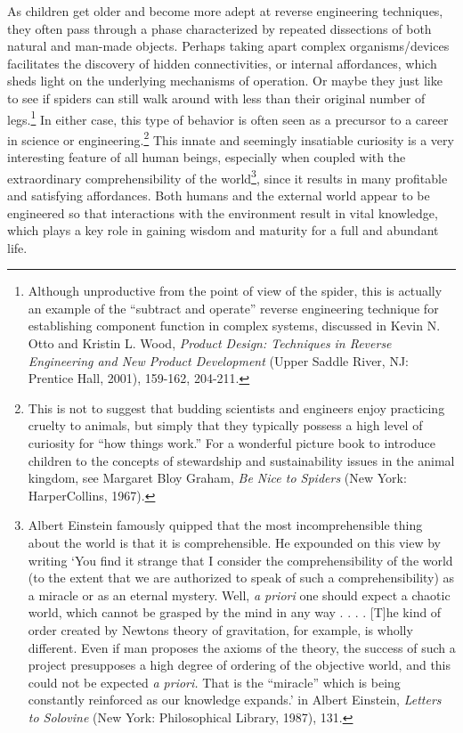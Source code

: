 As children get older and become more adept at reverse engineering
techniques, they often pass through a phase characterized by repeated
dissections of both natural and man-made objects. Perhaps taking apart
complex organisms/devices facilitates the discovery of hidden
connectivities, or internal affordances, which sheds light on the
underlying mechanisms of operation. Or maybe they just like to see if
spiders can still walk around with less than their original number of
legs.\footnote{Although unproductive from the point of view of the
spider, this is actually an example of the “subtract and operate”
reverse engineering technique for establishing component function in
complex systems, discussed in Kevin N. Otto and Kristin L. Wood,
\textit{Product Design: Techniques }\textit{in Reverse Engineering and
New Product Development} (Upper Saddle River, NJ: Prentice Hall, 2001),
159-162, 204-211.}
In either case, this type of behavior is often
seen as a precursor to a career in science or
engineering.\footnote{
This is not to suggest that budding scientists and
engineers enjoy practicing cruelty to animals, but simply that they
typically possess a high level of curiosity for “how things work.” For
a wonderful picture book to introduce children to the concepts of
stewardship and sustainability issues in the animal kingdom, see
Margaret Bloy Graham, \textit{Be Nice to Spiders} (New York:
HarperCollins, 1967).
}
This innate and seemingly insatiable
curiosity is a very interesting feature of all human beings, especially
when coupled with the extraordinary comprehensibility of the
world\footnote{
Albert Einstein famously quipped that the most
incomprehensible thing about the world is that it is comprehensible. He
expounded on this view by writing ‘You find it strange that I consider
the comprehensibility of the world (to the extent that we are
authorized to speak of such a comprehensibility) as a miracle or as an
eternal mystery. Well, \textit{a priori} one should expect a chaotic
world, which cannot be grasped by the mind in any way . . . . [T]he
kind of order created by Newton{\textquotesingle}s theory of
gravitation, for example, is wholly different. Even if man proposes the
axioms of the theory, the success of such a project presupposes a high
degree of ordering of the objective world, and this could not be
expected \textit{a priori.} That is the
``miracle'' which is being constantly
reinforced as our knowledge expands.’ in Albert Einstein,
\textit{Letters to Solovine} (New York: Philosophical Library, 1987),
131. 
}, since it results in many profitable and
satisfying affordances. Both humans and the external world appear to be
engineered so that interactions with the environment result in vital
knowledge, which plays a key role in gaining wisdom and maturity for a
full and abundant life.


